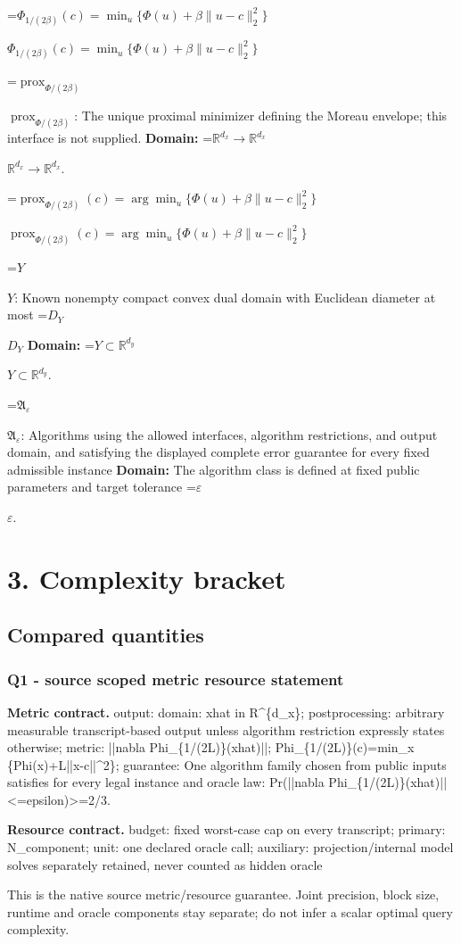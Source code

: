 \documentclass[10pt,a4paper]{article}
\newcommand{\AtlasMath}[1]{\par\begingroup\centering\setbox0=\hbox{$\displaystyle #1$}\ifdim\wd0>1.4\linewidth\typeout{ATLAS WIDE FORMULA: \the\wd0}\fi\ifdim\wd0>\linewidth\resizebox{\linewidth}{!}{\box0}\else\box0\fi\par\endgroup}
\newcommand{\AtlasInlineMath}[1]{\begingroup\setbox0=\hbox{$#1$}\ifdim\wd0>.4\linewidth\endgroup\AtlasMath{#1}\else\endgroup$#1$\fi}
\begin{document}
\AtlasInlineMath{\Phi_{1/(2\beta)}(c)=\min_u\{\Phi(u)+\beta\|u-c\|_2^2\}}

\AtlasInlineMath{\operatorname{prox}_{\Phi/(2\beta)}}: The unique proximal minimizer defining the Moreau envelope; this interface is not supplied. \textbf{Domain:} \AtlasInlineMath{\mathbb R^{d_x}\to\mathbb R^{d_x}}.

\AtlasInlineMath{\operatorname{prox}_{\Phi/(2\beta)}(c)=\arg\min_u\{\Phi(u)+\beta\|u-c\|_2^2\}}

\AtlasInlineMath{Y}: Known nonempty compact convex dual domain with Euclidean diameter at most \AtlasInlineMath{D_Y} \textbf{Domain:} \AtlasInlineMath{Y\subset\mathbb R^{d_y}}.

\AtlasInlineMath{\mathfrak A_\varepsilon}: Algorithms using the allowed interfaces, algorithm restrictions, and output domain, and satisfying the displayed complete error guarantee for every fixed admissible instance \textbf{Domain:} The algorithm class is defined at fixed public parameters and target tolerance \AtlasInlineMath{\varepsilon}.

\section{3. Complexity bracket}
\subsection{Compared quantities}
\subsubsection{Q1 - source scoped metric resource statement}
\textbf{Metric contract.} output: domain: xhat in R\textasciicircum{}\{d\_x\}; postprocessing: arbitrary measurable transcript-based output unless algorithm restriction expressly states otherwise; metric: ||nabla Phi\_\{1/(2L)\}(xhat)||; Phi\_\{1/(2L)\}(c)=min\_x \{Phi(x)+L||x-c||\textasciicircum{}2\}; guarantee: One algorithm family chosen from public inputs satisfies for every legal instance and oracle law: Pr(||nabla Phi\_\{1/(2L)\}(xhat)||<=epsilon)>=2/3.

\textbf{Resource contract.} budget: fixed worst-case cap on every transcript; primary: N\_component; unit: one declared oracle call; auxiliary: projection/internal model solves separately retained, never counted as hidden oracle

This is the native source metric/resource guarantee. Joint precision, block size, runtime and oracle components stay separate; do not infer a scalar optimal query complexity.
\end{document}
